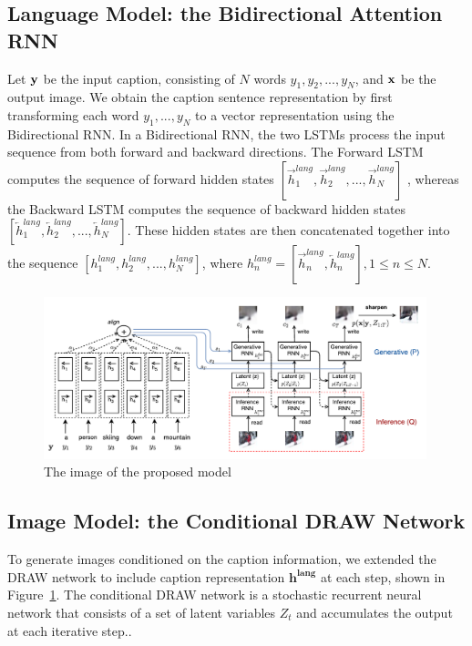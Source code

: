 \documentclass{article} %
\newcommand{\hlang}{h^{lang}}
\newcommand{\hlangall}{\boldsymbol{h^{lang}}}
\newcommand{\Lat}{Z}
\newcommand{\icaption}{{\bf{y}}}
\newcommand{\oimage}{{\bf{x}}}
\begin{document}
\subsection{Language Model: the Bidirectional Attention RNN}
\label{sec:lang}
Let $\icaption$ be the input caption, consisting of $N$ words $y_{1}, y_{2}, ..., y_{N}$, and $\oimage$ be the output image. We obtain the caption sentence representation by first transforming each word $y_{1},...,y_{N}$ to a vector representation using the Bidirectional RNN. In a Bidirectional RNN, the two LSTMs process the input sequence from both forward and backward directions. The Forward LSTM computes the sequence of forward hidden states $[\overrightarrow{h}^{lang}_{1}, \overrightarrow{h}^{lang}_{2}, ..., \overrightarrow{h}^{lang}_{N}]$ , whereas the Backward LSTM computes the sequence of backward hidden states $[\overleftarrow{h}^{lang}_{1}, \overleftarrow{h}^{lang}_{2}, ..., \overleftarrow{h}^{lang}_{N}]$. These hidden states are then concatenated together into the sequence $[\hlang_{1}, \hlang_{2}, ..., \hlang_{N}]$, where $\hlang_{n} = [\overrightarrow{h}^{lang}_{n}, \overleftarrow{h}^{lang}_{n}], 1\leq n\leq N$.

\begin{figure}[!t]
\captionsetup[subfigure]{labelformat=empty}
\begin{center}
\includegraphics[width=0.99\textwidth]{figures/alignDrawAnnotated.pdf}\quad
%
\end{center}
\caption{The image of the proposed model}
\label{fig:figmodel}
\vspace{-0.3cm}
\end{figure}



\subsection{Image Model: the Conditional DRAW Network}

To generate images conditioned on the caption information, we extended the DRAW network \citep{gregor_draw} to include caption representation $\hlangall$ at each step, shown in Figure~\ref{fig:figmodel}. The conditional DRAW network is a stochastic recurrent neural network that consists of a set of latent variables $\Lat_t$ and accumulates the output at each iterative step..
\end{document}
